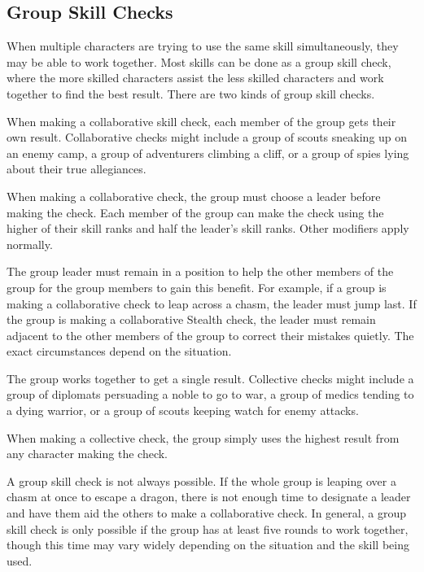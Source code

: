 \subsection{Group Skill Checks}
When multiple characters are trying to use the same skill simultaneously, they may be able to work together. Most skills can be done as a group skill check, where the more skilled characters assist the less skilled characters and work together to find the best result. There are two kinds of group skill checks.

 When making a collaborative skill check, each member of the group gets their own result. Collaborative checks might include a group of scouts sneaking up on an enemy camp, a group of adventurers climbing a cliff, or a group of spies lying about their true allegiances.

When making a collaborative check, the group must choose a leader before making the check. Each member of the group can make the check using the higher of their skill ranks and half the leader's skill ranks. Other modifiers apply normally.

The group leader must remain in a position to help the other members of the group for the group members to gain this benefit. For example, if a group is making a collaborative check to leap across a chasm, the leader must jump last. If the group is making a collaborative Stealth check, the leader must remain adjacent to the other members of the group to correct their mistakes quietly. The exact circumstances depend on the situation. 

 The group works together to get a single result. Collective checks might include a group of diplomats persuading a noble to go to war, a group of medics tending to a dying warrior, or a group of scouts keeping watch for enemy attacks.

When making a collective check, the group simply uses the highest result from any character making the check.

 A group skill check is not always possible. If the whole group is leaping over a chasm at once to escape a dragon, there is not enough time to designate a leader and have them aid the others to make a collaborative check. In general, a group skill check is only possible if the group has at least five rounds to work together, though this time may vary widely depending on the situation and the skill being used. 

